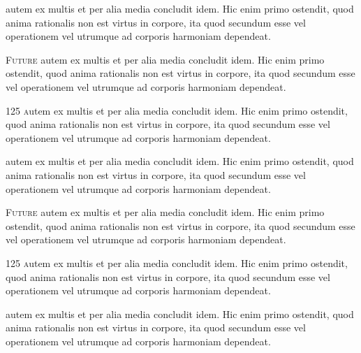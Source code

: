 \lettrine{}{}
autem ex multis et per alia media concludit idem. Hic enim primo ostendit, quod anima rationalis 
non est virtus in corpore, ita quod secundum esse vel
operationem vel utrumque ad corporis harmoniam dependeat.

\lettrine{}{Future}
autem ex multis et per alia media concludit idem. Hic enim primo ostendit, quod anima rationalis 
non est virtus in corpore, ita quod secundum esse vel
operationem vel utrumque ad corporis harmoniam dependeat.

\lettrine{125 }
autem ex multis et per alia media concludit idem. Hic enim primo ostendit, quod anima rationalis 
non est virtus in corpore, ita quod secundum esse vel
operationem vel utrumque ad corporis harmoniam dependeat.

\lettrine{}{}
autem ex multis et per alia media concludit idem. Hic enim primo ostendit, quod anima rationalis 
non est virtus in corpore, ita quod secundum esse vel
operationem vel utrumque ad corporis harmoniam dependeat.

\lettrine{}{Future}
autem ex multis et per alia media concludit idem. Hic enim primo ostendit, quod anima rationalis 
non est virtus in corpore, ita quod secundum esse vel
operationem vel utrumque ad corporis harmoniam dependeat.

\lettrine{125 }
autem ex multis et per alia media concludit idem. Hic enim primo ostendit, quod anima rationalis 
non est virtus in corpore, ita quod secundum esse vel
operationem vel utrumque ad corporis harmoniam dependeat.

\lettrine{}{}
autem ex multis et per alia media concludit idem. Hic enim primo ostendit, quod anima rationalis 
non est virtus in corpore, ita quod secundum esse vel
operationem vel utrumque ad corporis harmoniam dependeat.

